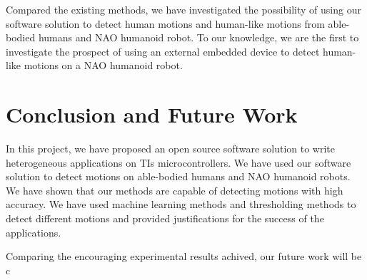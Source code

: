 \documentclass[letterpaper]{article}
\begin{document}
Compared the existing methods, we have investigated the possibility of using our software solution
to detect human motions and human-like motions from able-bodied humans and NAO humanoid robot. To
our knowledge, we are the first to investigate the prospect of using an external embedded device to
detect human-like motions on a NAO humanoid robot. 

\section{Conclusion and Future Work}

In this project, we have proposed an open source software solution to write heterogeneous
applications on TIs microcontrollers. We have used our software solution to detect motions on
able-bodied humans and NAO humanoid robots. We have shown that our methods are capable of detecting
motions with high accuracy. We have used machine learning methods and thresholding methods to
detect different motions and provided justifications for the success of the applications. 

\par
Comparing the encouraging experimental results achived, our future work will be c



\end{document}
